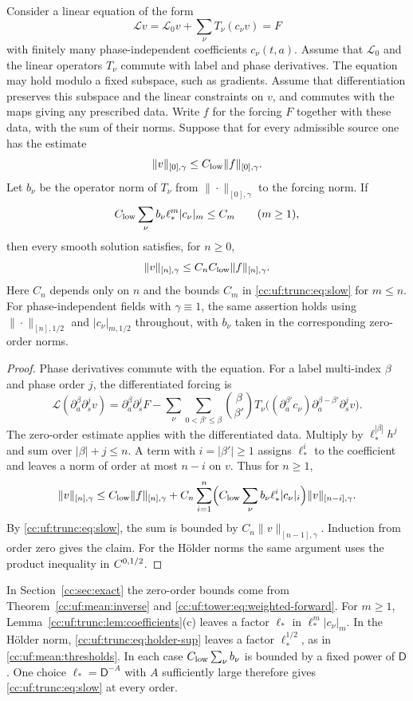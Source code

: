 \begin{lemma}\label{cc:uf:trunc:lem:lifting}
Consider a linear equation of the form
\[
 \mathcal Lv=\mathcal L_0v+\sum_\nu T_\nu(c_\nu v)=F
\]
with finitely many phase-independent coefficients $c_\nu(t,a)$.
Assume that $\mathcal L_0$ and the linear operators $T_\nu$ commute
with label and phase derivatives. The equation may hold modulo a fixed
subspace, such as gradients. Assume that differentiation preserves this
subspace and the linear constraints on $v$, and commutes with the maps
giving any prescribed data. Write $f$ for the forcing $F$ together with
these data, with the sum of their norms. Suppose that for every
admissible source one has the estimate
\[
 \|v\|_{[0],\gamma}\le C_{\rm low}\|f\|_{[0],\gamma}.
\]
Let $b_\nu$ be the operator norm of $T_\nu$ from
$\|\cdot\|_{[0],\gamma}$ to the forcing norm. If
\begin{equation}\label{cc:uf:trunc:eq:slow}
 C_{\rm low}\sum_\nu b_\nu\ell_*^m|c_\nu|_m\le C_m\qquad(m\ge1),
\end{equation}
then every smooth solution satisfies, for $n\ge0$,
\[
 \|v\|_{[n],\gamma}\le C_n C_{\rm low}\|f\|_{[n],\gamma}.
\]
Here $C_n$ depends only on $n$ and the bounds $C_m$ in
\eqref{cc:uf:trunc:eq:slow} for $m\le n$. For phase-independent fields
with $\gamma\equiv1$, the same assertion holds using
$\|\cdot\|_{[n],1/2}$ and $|c_\nu|_{m,1/2}$ throughout, with $b_\nu$
taken in the corresponding zero-order norms.
\end{lemma}
\begin{proof}
Phase derivatives commute with the equation. For a label multi-index
$\beta$ and phase order $j$, the differentiated forcing is
\[
 \mathcal L(\partial_a^\beta\partial_s^j v)
 =\partial_a^\beta\partial_s^j F-
 \sum_{\nu}\sum_{0<\beta'\le\beta}\binom{\beta}{\beta'}
 T_\nu\bigl((\partial_a^{\beta'}c_\nu)
          \partial_a^{\beta-\beta'}\partial_s^j v\bigr).
\]
The zero-order estimate applies with the differentiated data. Multiply
by $\ell_*^{|\beta|}h^j$ and sum over $|\beta|+j\le n$. A term with
$i=|\beta'|\ge1$ assigns $\ell_*^i$ to the coefficient and leaves
a norm of order at most $n-i$ on $v$. Thus for $n\ge1$,
\[
 \|v\|_{[n],\gamma}\le C_{\rm low}\|f\|_{[n],\gamma}
 +C_n\sum_{i=1}^n
 \Bigl(C_{\rm low}\sum_\nu b_\nu\ell_*^i|c_\nu|_i\Bigr)
 \|v\|_{[n-i],\gamma}.
\]
By \eqref{cc:uf:trunc:eq:slow}, the sum is bounded by
$C_n\|v\|_{[n-1],\gamma}$. Induction from order zero gives the claim.
For the H\"older norms the same argument uses the product inequality
in $C^{0,1/2}$.
\end{proof}

In Section~\ref{cc:sec:exact} the zero-order bounds come from
Theorem~\ref{cc:uf:mean:inverse} and \eqref{cc:uf:tower:eq:weighted-forward}.
For $m\ge1$, Lemma~\ref{cc:uf:trunc:lem:coefficients}(c) leaves a
factor $\ell_*$ in $\ell_*^m|c_\nu|_m$. In the H\"older norm,
\eqref{cc:uf:trunc:eq:holder-sup} leaves a factor $\ell_*^{1/2}$,
as in \eqref{cc:uf:mean:thresholds}. In each case $C_{\rm low}\sum_\nu b_\nu$
is bounded by a fixed power of $\mathsf D$. One choice
$\ell_*=\mathsf D^{-A}$ with $A$ sufficiently large therefore gives
\eqref{cc:uf:trunc:eq:slow} at every order.

